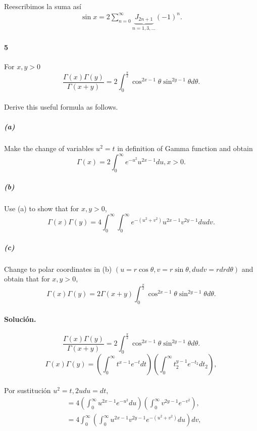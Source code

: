 \documentclass{article}
\begin{document}
\paragraph{}Reescribimos la suma así
\begin{align*}
\sin{x} = 2\sum_{n=0}^{\infty} \underbrace{J_{2n+1}}_{n = 1, 3, \dots}(-1)^n.
\end{align*}
\paragraph{5} For $x, y > 0$
$$\frac{\Gamma(x) \Gamma(y)}{\Gamma(x+y)} = 2 \int_{0}^{\frac{\pi}{2}} \cos^{2x-1}{\theta} \sin^{2y-1}{\theta} d\theta.$$
\paragraph{} Derive this useful formula as follows.
\subparagraph{(a)} Make the change of variables $u^2 = t$ in definition of Gamma function and obtain
$$\Gamma(x) = 2 \int_{0}^{\infty} e^{-u^2} u^{2x-1} du, x> 0.$$
\subparagraph{(b)} Use (a) to show that for $x, y > 0$,
$$\Gamma(x)\Gamma(y) = 4 \int_{0}^{\infty} \int_{0}^{\infty} e^{-(u^2 + v^2)} u^{2x-1}v^{2y-1} du dv.$$
\subparagraph{(c)} Change to polar coordinates in (b) $(u = r \cos{\theta}, v = r\sin{\theta}, du dv = r dr d \theta)$ and obtain that for $x,y>0$,
$$\Gamma(x)\Gamma(y) = 2 \Gamma(x+y) \int_{0}^{\frac{\pi}{2}} \cos^{2x-1}{\theta}\sin^{2y-1}{\theta} d\theta.$$
\paragraph{Solución.}
$$\frac{\Gamma(x) \Gamma(y)}{\Gamma(x+y)} = 2 \int_{0}^{\frac{\pi}{2}} \cos^{2x-1}{\theta} \sin^{2y-1}{\theta} d\theta.$$
$$\Gamma(x)\Gamma(y) = \left(\int_{0}^{\infty} t^{x-1}e^{-t} dt\right) \left(\int_{0}^{\infty}t_2^{y-1}e^{-t_2} dt_2\right),$$
\paragraph{}Por sustitución $u^2 = t, 2u du = dt,$
\begin{align*}
&= 4 \left(\int_{0}^{\infty}u^{2x-1}e^{-u^2}du\right) \left(\int_{0}^{\infty}v^{2y -1} e^{-v^2}\right),\\
&= 4 \int_{0}^{\infty}\left(\int_{0}^{\infty}u^{2x-1}v^{2y-1} e^{-(u^2 + v^2)}du\right)dv,
\end{align*}
\end{document}
